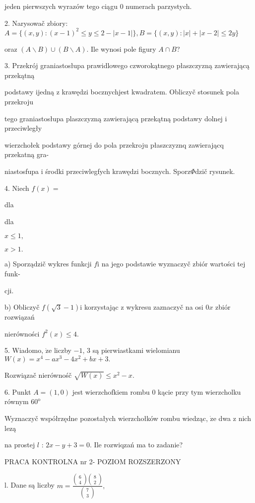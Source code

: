 \documentclass[a4paper,12pt]{article}
\begin{document}
jeden pierwszych wyrazów tego ciągu $0$ numerach parzystych.

2. Narysowač zbiory: $A=\{(x,y):(x-1)^{2}\leq y\leq 2-|x-1|\}, B=\{(x,y):|x|+|x-2|\leq 2y\}$

oraz $(A\backslash B)\cup(B\backslash A)$. Ile wynosi pole figury $A\cap B$?

3. Przekrój graniastosłupa prawidlowego czworokątnego płaszczyzną zawierającą przekątną

podstawy ijedną $\mathrm{z}$ krawędzi bocznychjest kwadratem. Obliczyč stosunek pola przekroju

tego graniastosłupa plaszczyzną zawierającą przekątną podstawy dolnej $\mathrm{i}$ przeciwległy

wierzchołek podstawy górnej do pola przekroju płaszczyznq zawierającq przekatną gra-

niastosfupa $\mathrm{i}$ środki przeciwlegfych krawędzi bocznych. Sporz$\Phi$dzič rysunek.

4. Niech $f(x)=$

dla

dla

$x\leq 1,$

$x>1.$

a) Sporządzič wykres funkcji $f\mathrm{i}$ na jego podstawie wyznaczyč zbiór wartości tej funk-

cji.

b) Obliczyč $f(\sqrt{3}-1) \mathrm{i}$ korzystając $\mathrm{z}$ wykresu zaznaczyč na osi $0x$ zbiór rozwiązań

nierówności $f^{2}(x)\leq 4.$

5. Wiadomo, $\dot{\mathrm{z}}\mathrm{e}$ liczby $-1$, 3 są pierwiastkami wielomianu $W(x)=x^{4}-ax^{3}-4x^{2}+bx+3.$

Rozwiązač nierównośč $\sqrt{W(x)}\leq x^{2}-x.$

6. Punkt $A=(1,0)$ jest wierzchofkiem rombu $0$ kącie przy tym wierzcholku równym $60^{\mathrm{o}}$

Wyznaczyč współrzędne pozostałych wierzchołków rombu wiedząc, $\dot{\mathrm{z}}\mathrm{e}$ dwa $\mathrm{z}$ nich lezą

na prostej $l$ : $2x-y+3=0$. Ile rozwiqzań ma to zadanie?





PRACA KONTROLNA nr 2- POZIOM ROZSZERZONY

l. Dane są liczby $m=\displaystyle \frac{\left(\begin{array}{l}
6\\
4
\end{array}\right)\left(\begin{array}{l}
8\\
2
\end{array}\right)}{\left(\begin{array}{l}
7\\
3
\end{array}\right)},$
\end{document}
